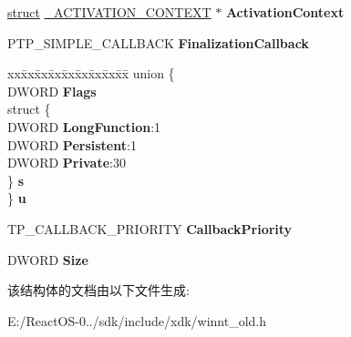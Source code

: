 \begin{DoxyCompactItemize}
\hyperlink{interfacestruct}{struct} \hyperlink{struct___a_c_t_i_v_a_t_i_o_n___c_o_n_t_e_x_t}{\+\_\+\+A\+C\+T\+I\+V\+A\+T\+I\+O\+N\+\_\+\+C\+O\+N\+T\+E\+XT} $\ast$ {\bfseries Activation\+Context}
\item 
\mbox{\label{struct___t_p___c_a_l_l_b_a_c_k___e_n_v_i_r_o_n___v3_a71cd45d28325d0fc7478751085d98aea}} 
P\+T\+P\+\_\+\+S\+I\+M\+P\+L\+E\+\_\+\+C\+A\+L\+L\+B\+A\+CK {\bfseries Finalization\+Callback}
\item 
\mbox{\label{struct___t_p___c_a_l_l_b_a_c_k___e_n_v_i_r_o_n___v3_af64554da9de75523beb3af4d6d580236}} 
\begin{tabbing}
xx\=xx\=xx\=xx\=xx\=xx\=xx\=xx\=xx\=\kill
union \{\\
\>DWORD {\bfseries Flags}\\
\>struct \{\\
\>\>DWORD {\bfseries LongFunction}:1\\
\>\>DWORD {\bfseries Persistent}:1\\
\>\>DWORD {\bfseries Private}:30\\
\>\} {\bfseries s}\\
\} {\bfseries u}\\

\end{tabbing}\item 
\mbox{\label{struct___t_p___c_a_l_l_b_a_c_k___e_n_v_i_r_o_n___v3_a83425b0dc4f34a0d1f5b39416742c034}} 
T\+P\+\_\+\+C\+A\+L\+L\+B\+A\+C\+K\+\_\+\+P\+R\+I\+O\+R\+I\+TY {\bfseries Callback\+Priority}
\item 
\mbox{\label{struct___t_p___c_a_l_l_b_a_c_k___e_n_v_i_r_o_n___v3_acbc1787af598ac30853fc3bd0cb9cded}} 
D\+W\+O\+RD {\bfseries Size}
\end{DoxyCompactItemize}


该结构体的文档由以下文件生成\+:\begin{DoxyCompactItemize}
\item 
E\+:/\+React\+O\+S-\/0../sdk/include/xdk/winnt\+\_\+old.\+h\end{DoxyCompactItemize}
